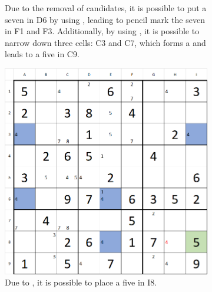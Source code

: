 \documentclass[twoside]{ausarbeitung}
\begin{document}
\begin{figure}[H]
\begin{subfigure}[t]{.475\textwidth}
  \caption{Due to the removal of candidates, it is possible to put a seven in D6 by using , leading to pencil mark the seven in F1 and F3. Additionally, by using , it is possible to narrow down three cells: C3 and C7, which forms a  and leads to a five in C9.}
  \label{fig:sfish2}
\end{subfigure}

\centering
\begin{subfigure}[t]{.475\textwidth}
  \centering
  \includegraphics[width=\linewidth]{images/sfish3.png}
  \caption{Due to , it is possible to place a five in I8.}
  \label{fig:sfish3}
\end{subfigure}%
\hfill
\begin{subfigure}[t]{.475\textwidth}
  \centering

\end{subfigure}
\end{figure}
\end{document}
